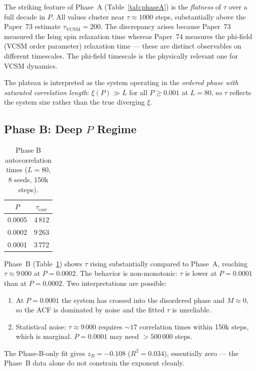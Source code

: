 \documentclass[12pt,a4paper]{article}
\begin{document}
The striking feature of Phase~A (Table~\ref{tab:phaseA}) is the \emph{flatness} of $\tau$
over a full decade in $P$.  All values cluster near $\tau \approx 1000$ steps,
substantially above the Paper~73 estimate $\tau_\mathrm{VCSM} = 200$.  The discrepancy
arises because Paper~73 measured the Ising spin relaxation time whereas Paper~74 measures
the phi-field (VCSM order parameter) relaxation time — these are distinct observables on
different timescales.  The phi-field timescale is the physically relevant one for
VCSM dynamics.

The plateau is interpreted as the system operating in the \emph{ordered phase with
saturated correlation length}: $\xi(P) \gg L$ for all $P \geq 0.001$ at $L=80$,
so $\tau$ reflects the system size rather than the true diverging $\xi$.

\subsection{Phase B: Deep $P$ Regime}

\begin{table}[h]
\centering
\caption{Phase B autocorrelation times ($L=80$, 8 seeds, 150k steps).}
\begin{tabular}{cc}
\toprule
$P$ & $\tau_\mathrm{corr}$ \\
\midrule
0.0005 & 4\,812 \\
0.0002 & 9\,263 \\
0.0001 & 3\,772 \\
\bottomrule
\end{tabular}
\label{tab:phaseB}
\end{table}

Phase~B (Table~\ref{tab:phaseB}) shows $\tau$ rising substantially compared to Phase~A,
reaching $\tau \approx 9\,000$ at $P = 0.0002$.  The behavior is non-monotonic:
$\tau$ is lower at $P = 0.0001$ than at $P = 0.0002$.  Two interpretations are possible:
\begin{enumerate}
  \item At $P=0.0001$ the system has crossed into the disordered phase and $M \approx 0$,
        so the ACF is dominated by noise and the fitted $\tau$ is unreliable.
  \item Statistical noise: $\tau \approx 9\,000$ requires $\sim 17$ correlation times
        within 150k steps, which is marginal.  $P=0.0001$ may need $>500\,000$ steps.
\end{enumerate}

The Phase-B-only fit gives $z_B = -0.108$ ($R^2 = 0.034$), essentially zero — the
Phase~B data alone do not constrain the exponent cleanly.
\end{document}
